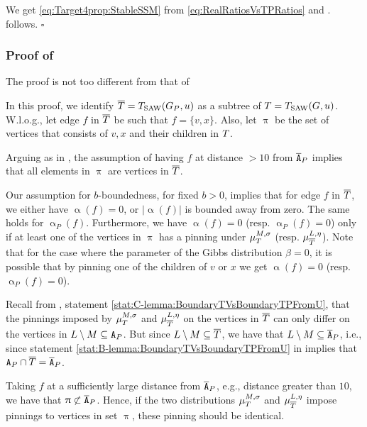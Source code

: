\documentclass[11pt,reqno]{amsart}
\numberwithin{equation}{section}
\newcommand{\blue}[1]{{\color{blue}#1}}
\newcommand{\cadmiumorange}[1]{{\color{cadmiumorange}#1}}
\newcommand{\deeppink}[1]{{\color{deeppink}#1}}
\newcommand{\electricviolet}[1]{{\color{electricviolet}#1}}
\newcommand{\goldenbrown}[1]{{\color{goldenbrown}#1}}
\newcommand{\heliotrope}[1]{{\color{heliotrope}#1}}
\newcommand{\red}[1]{{\color{red}#1}}
\newcommand{\Tsaw}{T_{\rm SAW}}
\newcommand{\abs}[1]{\blue{|}#1\blue{|}}
\renewcommand{\blue}[1]{#1}
\renewcommand{\cadmiumorange}[1]{#1}
\renewcommand{\deeppink}[1]{#1}
\renewcommand{\electricviolet}[1]{#1}
\renewcommand{\goldenbrown}[1]{#1}
\renewcommand{\heliotrope}[1]{#1}
\renewcommand{\red}[1]{#1}
\newcommand{\kf}{\deeppink{f}}
\newcommand{\kL}{\cadmiumorange{L}}
\newcommand{\kP}{\goldenbrown{P}}
\newcommand{\ku}{\red{u}}
\newcommand{\kv}{\electricviolet{v}}
\newcommand{\kx}{\heliotrope{x}}
\renewcommand{\kf}{f}
\renewcommand{\kL}{L}
\renewcommand{\kP}{P}
\renewcommand{\ku}{u}
\renewcommand{\kv}{v}
\renewcommand{\kx}{x}
\newcommand{\infweight}{\upalpha}
\begin{document}
We get \eqref{eq:Target4prop:StableSSM} from \eqref{eq:RealRatiosVsTPRatios} and . 
  follows. \hfill $\square$



\subsubsection{Proof of }
The proof is not too different from that of 



In this proof, we identify $\SMTPu=\Tsaw(\gext{G}{\kP},\ku)$ as a subtree of $\SMTu=\Tsaw(G,\ku)$. 
W.l.o.g.,  let edge $\kf$ in $\overline{T}$ be such that $\kf=\{\kv,\kx\}$. Also, let $\uppi$ be the set of vertices that consists 
of $\kv,\kx$ and their children in $T$.



Arguing as in , the assumption of having $\kf$ at distance $>10$ from $\cpTP$ implies
that all elements in $\uppi$ are vertices in $\overline{T}$. 



Our assumption for $b$-boundedness, for fixed $b>0$, implies that for edge $\kf$ in $\overline{T}$, we either 
have $\infweight(\kf)=0$, or $\abs{\infweight(\kf)}$ is bounded away from zero. The same holds for  
$\infweight_{\kP}(\kf)$. Furthermore, we have $\infweight(\kf)=0$ (resp. $\infweight_{\kP}(\kf)=0$) only if at 
least one of the vertices in $\uppi$ has a pinning under $\mu^{M,\sigma}_{T}$ (resp. $\mu^{L,\eta}_{\overline{T}}$).
Note that for the case where the parameter of the Gibbs distribution $\beta=0$, it is possible that by pinning one 
of the children of $\kv$ or $\kx$ we get $\infweight(\kf)=0$ (resp.  $\infweight_{\kP}(\kf)=0$). 



Recall from , statement \ref{stat:C-lemma:BoundaryTVsBoundaryTPFromU}, 
that the pinnings imposed by  $\mu^{M,\sigma}_{T}$ and $\mu^{\kL,\eta}_{\SMTPu}$ on the vertices in
$\overline{T}$ can only differ on the vertices in $\kL\setminus M\subseteq \cpT$.   But since $\kL\setminus M\subseteq \SMTPu$,
we have that $\kL\setminus M\subseteq \cpTP$, i.e., since statement  \ref{stat:B-lemma:BoundaryTVsBoundaryTPFromU} in
 implies that   $\cpT\cap \SMTPu=\cpTP$. 



Taking $\kf$ at a sufficiently large distance from $\cpTP$, e.g., distance greater than $10$, we have that  $\uppi\not\subset \cpTP$. 
Hence,  if the two distributions  $\mu^{M,\sigma}_{T}$ and $\mu^{\kL,\eta}_{\SMTPu}$ impose  pinnings to  vertices in 
set $\uppi$, these pinning should be identical. 
\end{document}
